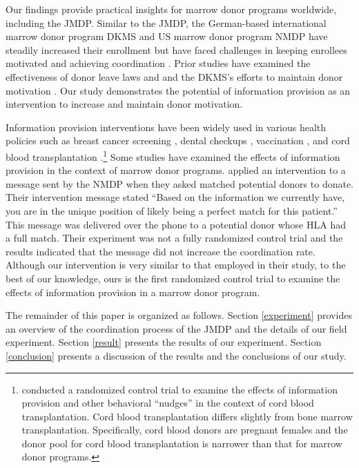 \documentclass[12pt, a4paper]{article}
\begin{document}
Our findings provide practical insights for marrow donor programs worldwide, including the JMDP. Similar to the JMDP, the German-based international marrow donor program DKMS and US marrow donor program NMDP have steadily increased their enrollment but have faced challenges in keeping enrollees motivated and achieving coordination \citep{Switzer1999, Switzer2004, Haylock2024}. Prior studies have examined the effectiveness of donor leave laws \citep{Lacetera2014} and and the DKMS's efforts to maintain donor motivation \citep{Haylock2024}. Our study demonstrates the potential of information provision as an intervention to increase and maintain donor motivation.

Information provision interventions have been widely used in various health policies such as breast cancer screening \citep{Bertoni2020}, dental checkups \citep{Altmann2014}, vaccination \citep[for example][]{Dai2021, Milkman2021}, and cord blood transplantation \citep{Grieco2018}.\footnote{\citet{Grieco2018} conducted a randomized control trial to examine the effects of information provision and other behavioral ``nudges'' in the context of cord blood transplantation. Cord blood transplantation differs slightly from bone marrow transplantation. Specifically, cord blood donors are pregnant females and the donor pool for cord blood transplantation is narrower than that for marrow donor programs.} Some studies have examined the effects of information provision in the context of marrow donor programs. \citet{Switzer2018} applied an intervention to a message sent by the NMDP when they asked matched potential donors to donate. Their intervention message stated ``Based on the information we currently have, you are in the unique position of likely being a perfect match for this patient.'' This message was delivered over the phone to a potential donor whose HLA had a full match. Their experiment was not a fully randomized control trial and the results indicated that the message did not increase the coordination rate. Although our intervention is very similar to that employed in their study, to the best of our knowledge, ours is the first randomized control trial to examine the effects of information provision in a marrow donor program.

The remainder of this paper is organized as follows. Section \ref{experiment} provides an overview of the coordination process of the JMDP and the details of our field experiment. Section \ref{result} presents the results of our experiment. Section \ref{conclusion} presents a discussion of the results and the conclusions of our study.
\end{document}
